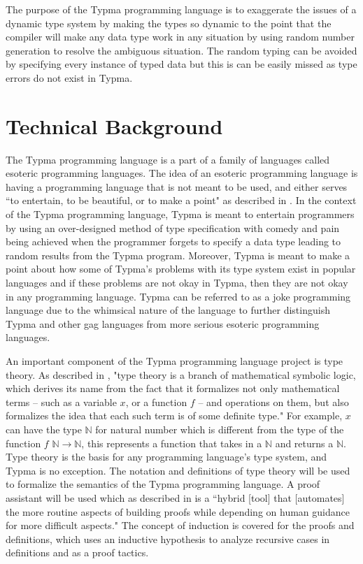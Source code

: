 \documentclass[10pt,twocolumn]{article}
\begin{document}
The purpose of the Typma programming language is to exaggerate the issues of a dynamic type system by making the types so dynamic to the point that the compiler will make any data type work in any situation by using random number generation to resolve the ambiguous situation. The random typing can be avoided by specifying every instance of typed data but this is can be easily missed as type errors do not exist in Typma.

\section{Technical Background}

The Typma programming language is a part of a family of languages called esoteric programming languages. The idea of an esoteric programming language is having a programming language that is not meant to be used, and either serves ``to
entertain, to be beautiful, or to make a point" as described in \textcite{Morr2014Esoteric}. In the context of the Typma programming language, Typma is meant to entertain programmers by using an over-designed method of type specification with comedy and pain being achieved when the programmer forgets to specify a data type leading to random results from the Typma program. Moreover, Typma is meant to make a point about how some of Typma's problems with its type system exist in popular languages and if these problems are not okay in Typma, then they are not okay in any programming language. Typma can be referred to as a joke programming language due to the whimsical nature of the language to further distinguish Typma and other gag languages from more serious esoteric programming languages.

An important component of the Typma programming language project is type theory. As described in \textcite{typetheory}, "type theory is a branch of mathematical symbolic logic, which derives its name from the fact that it formalizes not only mathematical terms – such as a variable $x$, or a function $f$ – and operations on them, but also formalizes the idea that each such term is of some definite type." For example, $x$ can have the type $\mathbb{N}$ for natural number which is different from the type of the function $f$ $\mathbb{N} \rightarrow \mathbb{N}$, this represents a function that takes in a $\mathbb{N}$ and returns a $\mathbb{N}$. Type theory is the basis for any programming language's type system, and Typma is no exception. The notation and definitions of type theory will be used to formalize the semantics of the Typma programming language. A proof assistant will be used which as described in \textcite{Pierce2021Software} is a ``hybrid [tool] that [automates] the more routine aspects of building proofs while depending on human guidance for more difficult aspects."
The concept of induction is covered for the proofs and definitions, which uses an inductive hypothesis to analyze recursive cases in definitions and as a proof tactics.
\end{document}
